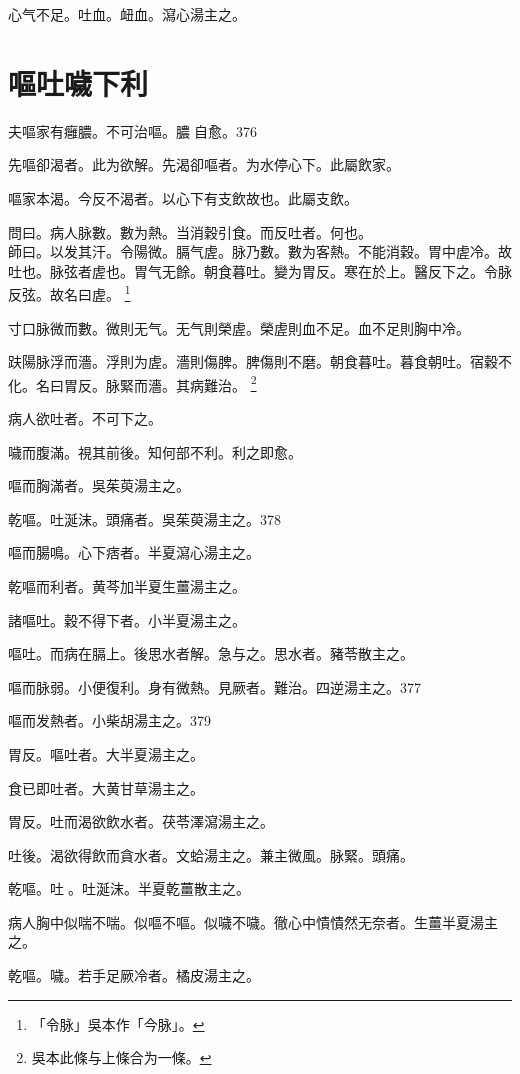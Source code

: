 心气不足。吐血。衄血。瀉心湯主之。

\chapter{嘔吐噦下利}

夫嘔家有癰膿。不可治嘔。膿{\sungtpii 𥁞}自愈。376

先嘔卻渴者。此为欲解。先渴卻嘔者。为水停心下。此屬飲家。

嘔家本渴。今反不渴者。以心下有支飲故也。此屬支飲。

問曰。病人脉數。數为熱。当消穀引食。而反吐者。何也。\\
師曰。以发其汗。令陽微。膈气虗。脉乃數。數为客熱。不能消穀。胃中虗冷。故吐也。脉弦者虗也。胃气无餘。朝食暮吐。變为胃反。寒在於上。醫反下之。令脉反弦。故名曰虗。
	\footnote{
	「令脉」吳本作「今脉」。
	}

寸口脉微而數。微則无气。无气則榮虗。榮虗則血不足。血不足則胸中冷。

趺陽脉浮而濇。浮則为虗。濇則傷脾。脾傷則不磨。朝食暮吐。暮食朝吐。宿穀不化。名曰胃反。脉緊而濇。其病難治。
	\footnote{
	吳本此條与上條合为一條。
	}

病人欲吐者。不可下之。

噦而腹滿。視其前後。知何部不利。利之即愈。

嘔而胸滿者。{\khaaitp 吳}茱萸湯主之。

乾嘔。吐涎沫。頭痛者。{\khaaitp 吳}茱萸湯主之。378

嘔而腸鳴。心下痞者。半夏瀉心湯主之。

乾嘔而利者。黄芩加半夏生薑湯主之。

諸嘔吐。穀不得下者。小半夏湯主之。

嘔吐。而病在膈上。後思水者解。急与之。思水者。豬苓散主之。

嘔而脉弱。小便復利。身有微熱。見厥者。難治。四逆湯主之。377

嘔而发熱者。小柴胡湯主之。379

胃反。嘔吐者。大半夏湯主之。

食已即吐者。大黄甘草湯主之。

胃反。吐而渴欲飲水者。茯苓澤瀉湯主之。

吐後。渴欲得飲而貪水者。文蛤湯主之。兼主微風。脉緊。頭痛。

乾嘔。吐{\sungtpii 𠱘}。吐涎沫。半夏乾薑散主之。

病人胸中似喘不喘。似嘔不嘔。似噦不噦。徹心中憒憒然无奈者。生薑半夏湯主之。

乾嘔。噦。若手足厥{\khaaitp 冷}者。橘皮湯主之。

